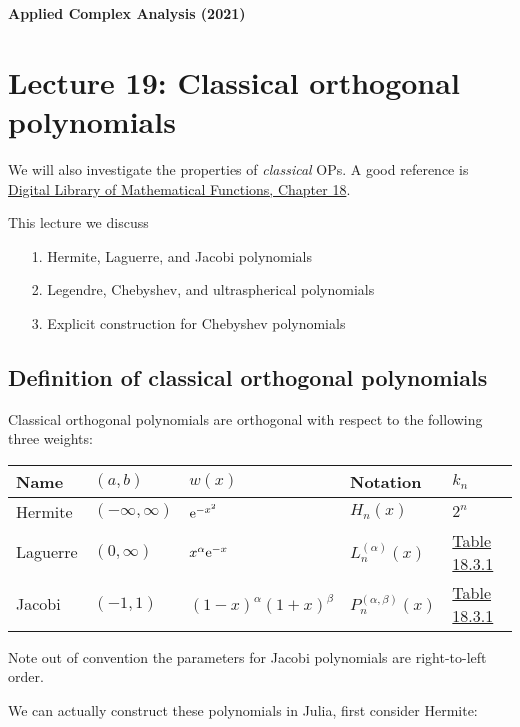 \documentclass[12pt,landscape]{article}
\def\E{ {\rm e} }
\begin{document}
{\LARGE
\sf
\textbf{Applied Complex Analysis (2021)}

\section{Lecture 19: Classical orthogonal polynomials}
We will also investigate the properties of \emph{classical} OPs. A good reference is  \href{http://dlmf.nist.gov/18}{Digital Library of Mathematical Functions, Chapter 18}.

This lecture we discuss

\begin{itemize}
\item[1. ] Hermite, Laguerre, and Jacobi polynomials


\item[2. ] Legendre, Chebyshev, and ultraspherical polynomials


\item[3. ] Explicit construction for Chebyshev polynomials

\end{itemize}
\subsection{Definition of classical orthogonal polynomials}
Classical orthogonal polynomials are orthogonal with respect to the following three weights:
\begin{center}
\begin{tabular}
{l | l | l | l | l}
Name & $(a,b)$ & $w(x)$ & Notation & $k_n$ \\
\hline
Hermite & $(-\infty,\infty)$ & $\E^{-x^2}$ & $H_n(x)$ & $2^n$ \\
Laguerre & $(0,\infty)$ & $x^\alpha \E^{-x}$ & $L_n^{(\alpha)}(x)$ & \href{http://dlmf.nist.gov/18.3}{Table 18.3.1} \\
Jacobi & $(-1,1)$ & $(1-x)^{\alpha} (1+x)^\beta$ & $P_n^{(\alpha,\beta)}(x)$ & \href{http://dlmf.nist.gov/18.3}{Table 18.3.1} \\
\end{tabular}
\end{center}
Note out of convention the parameters for Jacobi polynomials are right-to-left order.

We can actually construct these polynomials in Julia, first consider Hermite:


}
\end{document}
